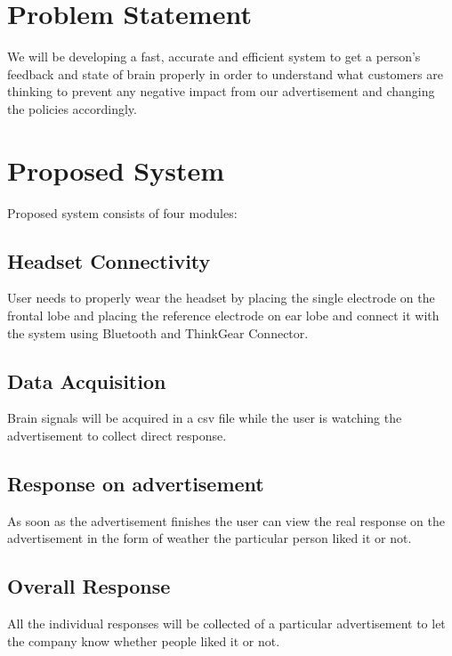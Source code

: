 \documentclass[a4paper, 12pt, oneside]{uet_thesis}
\begin{document}
\newpage
\chapter{Problem Statement}
We will be developing a fast, accurate and efficient system to get a person’s feedback and state of brain properly in order to understand what customers are thinking to prevent any negative impact from our advertisement and changing the policies accordingly. 

\newpage
\chapter{Proposed System}
Proposed system consists of four modules:

\section{Headset Connectivity}
User needs to properly wear the headset by placing the single electrode on the frontal lobe and placing the reference electrode on ear lobe and connect it with the system using Bluetooth and ThinkGear Connector.
\section{Data Acquisition}
Brain signals will be acquired in a csv file while the user is watching the advertisement to collect direct response.
\section{Response on advertisement}
As soon as the advertisement finishes the user can view the real response on the advertisement in the form of weather the particular person liked it or not.
\section{Overall Response}
All the individual responses will be collected of a particular advertisement to let the company know whether people liked it or not.
\end{document}
